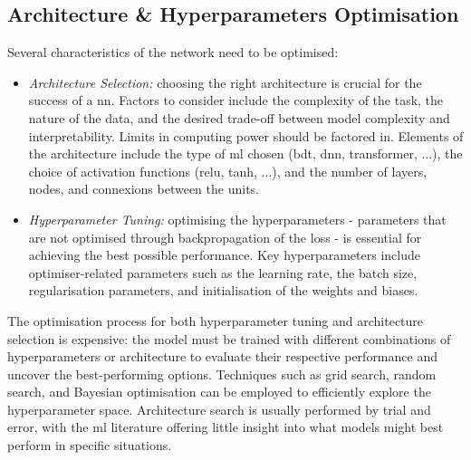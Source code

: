 \subsection{Architecture \& Hyperparameters Optimisation}
Several characteristics of the network need to be optimised: 
\begin{itemize}[leftmargin=*]
    \item \textit{Architecture Selection:} choosing the right architecture is crucial for the success of a \gls{nn}. Factors to consider include the complexity of the task, the nature of the data, and the desired trade-off between model complexity and interpretability. Limits in computing power should be factored in. Elements of the architecture include the type of \gls{ml} chosen (\gls{bdt}, \gls{dnn}, transformer, ...), the choice of activation functions (\gls{relu}, tanh, ...), and the number of layers, nodes, and connexions between the units.
    \item \textit{Hyperparameter Tuning:} optimising the hyperparameters - parameters that are not optimised through backpropagation of the loss - is essential for achieving the best possible performance. Key hyperparameters include optimiser-related parameters such as the learning rate, the batch size, regularisation parameters, and initialisation of the weights and biases.
\end{itemize}
The optimisation process for both hyperparameter tuning and architecture selection is expensive: the model must be trained with different combinations of hyperparameters or architecture to evaluate their respective performance and uncover the best-performing options. Techniques such as grid search, random search, and Bayesian optimisation can be employed to efficiently explore the hyperparameter space. Architecture search is usually performed by trial and error, with the \gls{ml} literature offering little insight into what models might best perform in specific situations. 

